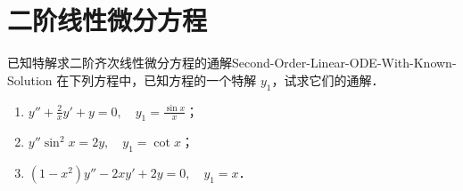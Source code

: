 \section{二阶线性微分方程}

\begin{problem}{已知特解求二阶齐次线性微分方程的通解}{Second-Order-Linear-ODE-With-Known-Solution}
    在下列方程中，已知方程的一个特解 $y_1$，试求它们的通解．
    \begin{enumerate}
        \item $y'' + \frac{2}{x}y' + y = 0, \quad y_1 = \frac{\sin x}{x}$；
        \item $y'' \sin^2 x = 2y, \quad y_1 = \cot x$；
        \item $(1 - x^2)y'' - 2xy' + 2y = 0, \quad y_1 = x$．
    \end{enumerate}
\end{problem}


